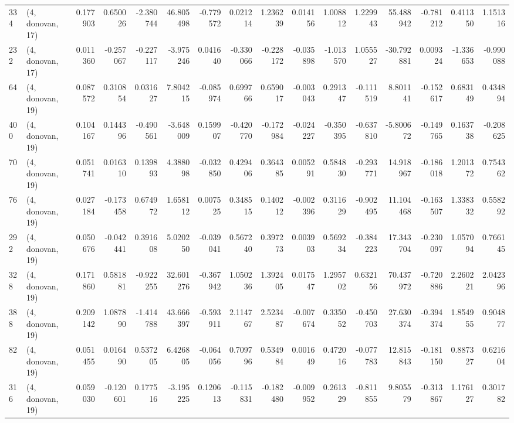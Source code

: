 \begin{tabular}{llrrrrrrrrrrrrrr}
334 &  (4, donovan, 17) &   0.177903 &  0.650026 & -2.380744 &   46.805498 & -0.779572 &   0.021214 &  1.236239 &  0.014156 &  1.008812 &  1.229943 &   55.488942 & -0.781212 &  0.411350 &  1.151316 \\
232 &  (4, donovan, 17) &   0.011360 & -0.257067 & -0.227117 &   -3.975246 &  0.041640 &  -0.330066 & -0.228172 & -0.035898 & -1.013570 &  1.055527 &  -30.792881 &  0.009324 & -1.336653 & -0.990088 \\
64  &  (4, donovan, 19) &   0.087572 &  0.310854 &  0.031627 &    7.804215 & -0.085974 &   0.699766 &  0.659017 & -0.003043 &  0.291347 & -0.111519 &    8.801141 & -0.152617 &  0.683149 &  0.434894 \\
400 &  (4, donovan, 19) &   0.104167 &  0.144396 & -0.490561 &   -3.648009 &  0.159907 &  -0.420770 & -0.172984 & -0.024227 & -0.350395 & -0.637810 &   -5.800672 & -0.149765 &  0.163738 & -0.208625 \\
70  &  (4, donovan, 19) &   0.051741 &  0.016310 &  0.139893 &    4.388098 & -0.032850 &   0.429406 &  0.364385 &  0.005291 &  0.584830 & -0.293771 &   14.918967 & -0.186018 &  1.201372 &  0.754362 \\
76  &  (4, donovan, 19) &   0.027184 & -0.173458 &  0.674972 &    1.658112 &  0.007525 &   0.348515 &  0.140212 & -0.002396 &  0.311629 & -0.902495 &   11.104468 & -0.163507 &  1.338332 &  0.558292 \\
292 &  (4, donovan, 19) &   0.050676 & -0.042441 &  0.391608 &    5.020250 & -0.039041 &   0.567240 &  0.397273 &  0.003903 &  0.569234 & -0.384223 &   17.343704 & -0.230097 &  1.057094 &  0.766145 \\
328 &  (4, donovan, 19) &   0.171860 &  0.581881 & -0.922255 &   32.601276 & -0.367942 &   1.050236 &  1.392405 &  0.017547 &  1.295702 &  0.632156 &   70.437972 & -0.720886 &  2.260221 &  2.042396 \\
388 &  (4, donovan, 19) &   0.209142 &  1.087890 & -1.414788 &   43.666397 & -0.593911 &   2.114767 &  2.523487 & -0.007674 &  0.335052 & -0.450703 &   27.630374 & -0.394374 &  1.854955 &  0.904877 \\
82  &  (4, donovan, 19) &   0.051455 &  0.016490 &  0.537205 &    6.426805 & -0.064056 &   0.709796 &  0.534984 &  0.001649 &  0.472016 & -0.077783 &   12.815843 & -0.181150 &  0.887327 &  0.621604 \\
316 &  (4, donovan, 19) &   0.059030 & -0.120601 &  0.177516 &   -3.195225 &  0.120613 &  -0.115831 & -0.182480 & -0.009952 &  0.261329 & -0.811855 &    9.805579 & -0.313867 &  1.176127 &  0.301782 \\

\end{tabular}

